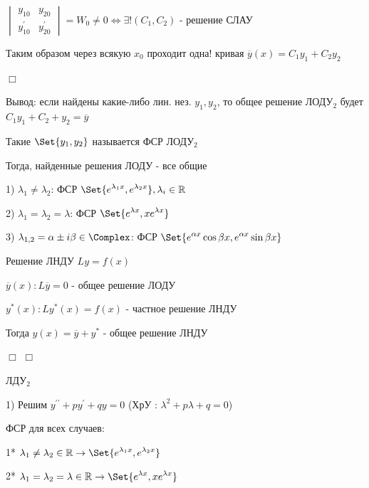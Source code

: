 \documentclass[12pt]{article}
\begin{document}
    $\displaystyle \begin{vmatrix}y_{10} & y_{20} \\ y^\prime_{10} & y^\prime_{20}\end{vmatrix} = W_0 \neq 0 \Longleftrightarrow \exists! (C_1, C_2)$ - решение СЛАУ

    Таким образом через всякую $\displaystyle x_0$ проходит одна! кривая $\displaystyle \overline{y}(x) = C_1 y_1 + C_2 y_2$

    $\Box$

    \Nota Вывод: если найдены какие-либо лин. нез. $\displaystyle y_1, y_2$, то общее решение ЛОДУ$\displaystyle _2$ будет $\displaystyle C_1 y_1 + C_2 + y_2 = \overline{y}$

    \Def Такие $\displaystyle \Set{y_1, y_2}$ называется ФСР ЛОДУ$\displaystyle _2$

    \Nota Тогда, найденные решения ЛОДУ - все общие

    1) $\displaystyle \lambda_1 \neq \lambda_2$: ФСР $\displaystyle \Set{e^{\lambda_1 x}, e^{\lambda_2 x}}, \lambda_i \in \Real$

    2) $\displaystyle \lambda_1 = \lambda_2 = \lambda$: ФСР $\displaystyle \Set{e^{\lambda x}, x e^{\lambda x}}$

    3) $\displaystyle \lambda_{1,2} = \alpha \pm i \beta \in \mathbb{\Complex}$: ФСР $\displaystyle \Set{e^{\alpha x} \cos\beta x, e^{\alpha x} \sin \beta x}$

     Решение ЛНДУ $Ly = f(x)$

    $\overline{y}(x): L\overline{y} = 0$ - общее решение ЛОДУ

    $\displaystyle y^*(x): Ly^*(x) = f(x)$ - частное решение ЛНДУ

    Тогда $\displaystyle y(x) = \overline{y} + y^*$ - общее решение ЛНДУ

    $\Box$ \Lab $\Box$



    \Mem ЛДУ$\displaystyle _2$

    1) Решим $\displaystyle y^{\prime\prime} + py^\prime + qy = 0$ (ХрУ \Cat: $\displaystyle \lambda^2 + p \lambda + q = 0$)

    ФСР для всех случаев:

    1* $\displaystyle \lambda_1 \neq \lambda_2 \in \Real \to \Set{e^{\lambda_1 x}, e^{\lambda_2 x}}$

    2* $\displaystyle \lambda_1 = \lambda_2 = \lambda \in \Real \to \Set{e^{\lambda x}, xe^{\lambda x}}$
\end{document}
